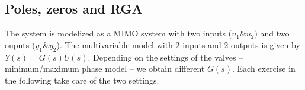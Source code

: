 \subsection{Poles, zeros and RGA}

The system is modelized as a MIMO system with two inputs ($u_1 \& u_2$) and two ouputs ($y_1 \& y_2$).
The multivariable model with $2$ inputs and $2$ outputs is given by $Y(s) = G(s)U(s)$.
Depending on the settings of the valves -- minimum/maximum phase model -- we obtain different $G(s)$.
Each exercise in the following take care of the two settings.



% 
% 
% 
% 
